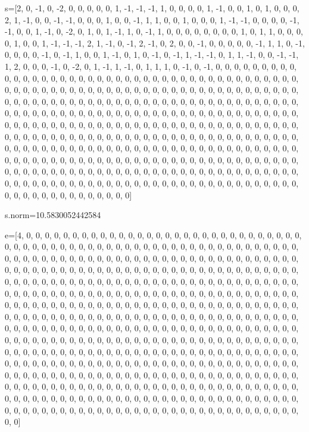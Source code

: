 \documentclass[12pt,a4paper]{article}
\numberwithin{equation}{section}
\begin{document}
s=[2, 0, -1, 0, -2, 0, 0, 0, 0, 0, 1, -1, -1, -1, 1, 0, 0, 0, 0, 1, -1, 0, 0, 1, 0, 1, 0, 0, 0, 2, 1, -1, 0, 0, -1, -1, 0, 0, 0, 1, 0, 0, -1, 1, 1, 0, 0, 1, 0, 0, 0, 1, -1, -1, 0, 0, 0, 0, -1, -1, 0, 0, 1, -1, 0, -2, 0, 1, 0, 1, -1, 1, 0, -1, 1, 0, 0, 0, 0, 0, 0, 0, 0, 1, 0, 1, 1, 0, 0, 0, 0, 1, 0, 0, 1, -1, -1, -1, 2, 1, -1, 0, -1, 2, -1, 0, 2, 0, 0, -1, 0, 0, 0, 0, 0, -1, 1, 1, 0, -1, 0, 0, 0, 0, -1, 0, -1, 1, 0, 0, 1, -1, 0, 1, 0, -1, 0, -1, 1, -1, -1, 0, 1, 1, -1, 0, 0, -1, -1, 1, 2, 0, 0, 0, -1, 0, -2, 0, 1, -1, 1, -1, 0, 1, 1, 1, 0, -1, 0, -1, 0, 0, 0, 0, 0, 0, 0, 0, 0, 0, 0, 0, 0, 0, 0, 0, 0, 0, 0, 0, 0, 0, 0, 0, 0, 0, 0, 0, 0, 0, 0, 0, 0, 0, 0, 0, 0, 0, 0, 0, 0, 0, 0, 0, 0, 0, 0, 0, 0, 0, 0, 0, 0, 0, 0, 0, 0, 0, 0, 0, 0, 0, 0, 0, 0, 0, 0, 0, 0, 0, 0, 0, 0, 0, 0, 0, 0, 0, 0, 0, 0, 0, 0, 0, 0, 0, 0, 0, 0, 0, 0, 0, 0, 0, 0, 0, 0, 0, 0, 0, 0, 0, 0, 0, 0, 0, 0, 0, 0, 0, 0, 0, 0, 0, 0, 0, 0, 0, 0, 0, 0, 0, 0, 0, 0, 0, 0, 0, 0, 0, 0, 0, 0, 0, 0, 0, 0, 0, 0, 0, 0, 0, 0, 0, 0, 0, 0, 0, 0, 0, 0, 0, 0, 0, 0, 0, 0, 0, 0, 0, 0, 0, 0, 0, 0, 0, 0, 0, 0, 0, 0, 0, 0, 0, 0, 0, 0, 0, 0, 0, 0, 0, 0, 0, 0, 0, 0, 0, 0, 0, 0, 0, 0, 0, 0, 0, 0, 0, 0, 0, 0, 0, 0, 0, 0, 0, 0, 0, 0, 0, 0, 0, 0, 0, 0, 0, 0, 0, 0, 0, 0, 0, 0, 0, 0, 0, 0, 0, 0, 0, 0, 0, 0, 0, 0, 0, 0, 0, 0, 0, 0, 0, 0, 0, 0, 0, 0, 0, 0, 0, 0, 0, 0, 0, 0, 0, 0, 0, 0, 0, 0, 0, 0, 0, 0, 0, 0, 0, 0, 0, 0, 0, 0, 0, 0, 0, 0, 0, 0, 0, 0, 0, 0, 0, 0, 0, 0, 0, 0, 0, 0, 0, 0, 0, 0, 0, 0, 0, 0, 0, 0, 0, 0, 0, 0, 0, 0, 0, 0, 0, 0, 0, 0, 0, 0, 0, 0, 0, 0, 0, 0, 0, 0, 0, 0, 0, 0, 0, 0, 0, 0, 0, 0, 0, 0, 0, 0, 0, 0, 0, 0, 0, 0]

s.norm=10.5830052442584

e=[4, 0, 0, 0, 0, 0, 0, 0, 0, 0, 0, 0, 0, 0, 0, 0, 0, 0, 0, 0, 0, 0, 0, 0, 0, 0, 0, 0, 0, 0, 0, 0, 0, 0, 0, 0, 0, 0, 0, 0, 0, 0, 0, 0, 0, 0, 0, 0, 0, 0, 0, 0, 0, 0, 0, 0, 0, 0, 0, 0, 0, 0, 0, 0, 0, 0, 0, 0, 0, 0, 0, 0, 0, 0, 0, 0, 0, 0, 0, 0, 0, 0, 0, 0, 0, 0, 0, 0, 0, 0, 0, 0, 0, 0, 0, 0, 0, 0, 0, 0, 0, 0, 0, 0, 0, 0, 0, 0, 0, 0, 0, 0, 0, 0, 0, 0, 0, 0, 0, 0, 0, 0, 0, 0, 0, 0, 0, 0, 0, 0, 0, 0, 0, 0, 0, 0, 0, 0, 0, 0, 0, 0, 0, 0, 0, 0, 0, 0, 0, 0, 0, 0, 0, 0, 0, 0, 0, 0, 0, 0, 0, 0, 0, 0, 0, 0, 0, 0, 0, 0, 0, 0, 0, 0, 0, 0, 0, 0, 0, 0, 0, 0, 0, 0, 0, 0, 0, 0, 0, 0, 0, 0, 0, 0, 0, 0, 0, 0, 0, 0, 0, 0, 0, 0, 0, 0, 0, 0, 0, 0, 0, 0, 0, 0, 0, 0, 0, 0, 0, 0, 0, 0, 0, 0, 0, 0, 0, 0, 0, 0, 0, 0, 0, 0, 0, 0, 0, 0, 0, 0, 0, 0, 0, 0, 0, 0, 0, 0, 0, 0, 0, 0, 0, 0, 0, 0, 0, 0, 0, 0, 0, 0, 0, 0, 0, 0, 0, 0, 0, 0, 0, 0, 0, 0, 0, 0, 0, 0, 0, 0, 0, 0, 0, 0, 0, 0, 0, 0, 0, 0, 0, 0, 0, 0, 0, 0, 0, 0, 0, 0, 0, 0, 0, 0, 0, 0, 0, 0, 0, 0, 0, 0, 0, 0, 0, 0, 0, 0, 0, 0, 0, 0, 0, 0, 0, 0, 0, 0, 0, 0, 0, 0, 0, 0, 0, 0, 0, 0, 0, 0, 0, 0, 0, 0, 0, 0, 0, 0, 0, 0, 0, 0, 0, 0, 0, 0, 0, 0, 0, 0, 0, 0, 0, 0, 0, 0, 0, 0, 0, 0, 0, 0, 0, 0, 0, 0, 0, 0, 0, 0, 0, 0, 0, 0, 0, 0, 0, 0, 0, 0, 0, 0, 0, 0, 0, 0, 0, 0, 0, 0, 0, 0, 0, 0, 0, 0, 0, 0, 0, 0, 0, 0, 0, 0, 0, 0, 0, 0, 0, 0, 0, 0, 0, 0, 0, 0, 0, 0, 0, 0, 0, 0, 0, 0, 0, 0, 0, 0, 0, 0, 0, 0, 0, 0, 0, 0, 0, 0, 0, 0, 0, 0, 0, 0, 0, 0, 0, 0, 0, 0, 0, 0, 0, 0, 0, 0, 0, 0, 0, 0, 0, 0, 0, 0, 0, 0, 0, 0, 0, 0, 0, 0, 0, 0, 0, 0, 0, 0, 0, 0, 0, 0, 0, 0, 0, 0, 0, 0, 0, 0, 0, 0, 0, 0, 0, 0, 0, 0, 0, 0, 0, 0, 0]
\end{document}
